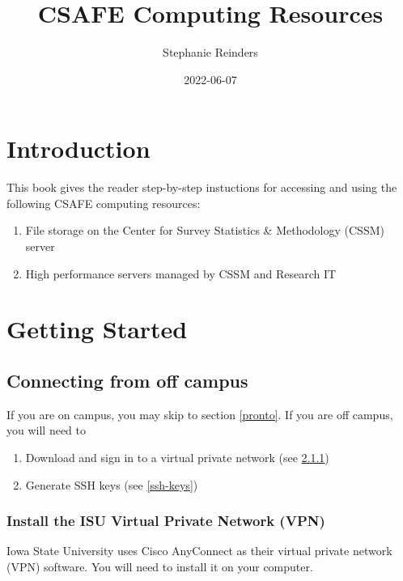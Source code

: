 \documentclass[
]{book}
\title{CSAFE Computing Resources}
\author{Stephanie Reinders}
\date{2022-06-07}
\providecommand{\tightlist}{%
  \setlength{\itemsep}{0pt}\setlength{\parskip}{0pt}}
\begin{document}
\maketitle

{
\setcounter{tocdepth}{1}
\tableofcontents
}
\hypertarget{introduction}{%
\chapter{Introduction}\label{introduction}}

This book gives the reader step-by-step instuctions for accessing and using the following CSAFE computing resources:

\begin{enumerate}
\def\labelenumi{\arabic{enumi}.}
\tightlist
\item
  File storage on the Center for Survey Statistics \& Methodology (CSSM) server
\item
  High performance servers managed by CSSM and Research IT
\end{enumerate}

\hypertarget{getting-started}{%
\chapter{Getting Started}\label{getting-started}}

\hypertarget{connecting-from-off-campus}{%
\section{Connecting from off campus}\label{connecting-from-off-campus}}

If you are on campus, you may skip to section \ref{pronto}. If you are off campus, you will need to

\begin{enumerate}
\def\labelenumi{\arabic{enumi}.}
\tightlist
\item
  Download and sign in to a virtual private network (see \ref{install-vpn})
\item
  Generate SSH keys (see \ref{ssh-keys})
\end{enumerate}

\hypertarget{install-vpn}{%
\subsection{Install the ISU Virtual Private Network (VPN)}\label{install-vpn}}

Iowa State University uses Cisco AnyConnect as their virtual private network (VPN) software. You will need to install it on your computer.
\end{document}
